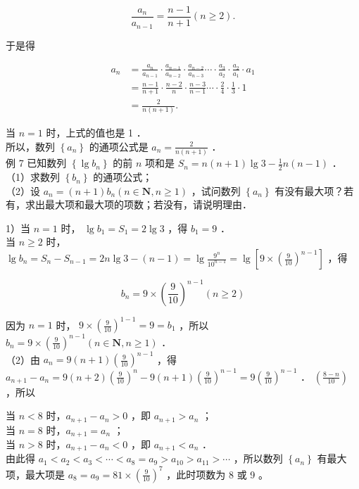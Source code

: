 \documentclass[10pt]{article}
\begin{document}
\[
\frac{a_{n}}{a_{n-1}}=\frac{n-1}{n+1}(n \geqslant 2) .
\]

于是得

\[
\begin{aligned}
a_{n} & =\frac{a_{n}}{a_{n-1}} \cdot \frac{a_{n-1}}{a_{n-2}} \cdot \frac{a_{n-2}}{a_{n-3}} \cdots \cdot \frac{a_{3}}{a_{2}} \cdot \frac{a_{2}}{a_{1}} \cdot a_{1} \\
& =\frac{n-1}{n+1} \cdot \frac{n-2}{n} \cdot \frac{n-3}{n-1} \cdots \cdot \frac{2}{4} \cdot \frac{1}{3} \cdot 1 \\
& =\frac{2}{n(n+1)} .
\end{aligned}
\]

当 \(n=1\) 时，上式的值也是 1 ．\\
所以，数列 \(\left\{a_{n}\right\}\) 的通项公式是 \(a_{n}=\frac{2}{n(n+1)}\) ．\\
例 7 已知数列 \(\left\{\lg b_{n}\right\}\) 的前 \(n\) 项和是 \(S_{n}=n(n+1) \lg 3-\frac{1}{2} n(n-1)\) ．\\
（1）求数列 \(\left\{b_{n}\right\}\) 的通项公式；\\
（2）设 \(a_{n}=(n+1) b_{n}(n \in \mathbf{N}, n \geqslant 1)\) ，试问数列 \(\left\{a_{n}\right\}\) 有没有最大项？若有，求出最大项和最大项的项数；若没有，请说明理由．

1）当 \(n=1\) 时， \(\lg b_{1}=S_{1}=2 \lg 3\) ，得 \(b_{1}=9\) ．\\
当 \(n \geqslant 2\) 时， \(\lg b_{n}=S_{n}-S_{n-1}=2 n \lg 3-(n-1)=\lg \frac{9^{n}}{10^{n-1}}=\lg \left[9 \times\left(\frac{9}{10}\right)^{n-1}\right]\) ，得

\[
b_{n}=9 \times\left(\frac{9}{10}\right)^{n-1}(n \geqslant 2)
\]

因为 \(n=1\) 时， \(9 \times\left(\frac{9}{10}\right)^{1-1}=9=b_{1}\) ，所以 \(b_{n}=9 \times\left(\frac{9}{10}\right)^{n-1}(n \in \mathbf{N}, n \geqslant 1)\) ．\\
（2）由 \(a_{n}=9(n+1)\left(\frac{9}{10}\right)^{n-1}\) ，得 \(a_{n+1}-a_{n}=9(n+2)\left(\frac{9}{10}\right)^{n}-9(n+1)\left(\frac{9}{10}\right)^{n-1}=9\left(\frac{9}{10}\right)^{n-1}\) ． \(\left(\frac{8-n}{10}\right)\) ，所以

当 \(n<8\) 时，\(a_{n+1}-a_{n}>0\) ，即 \(a_{n+1}>a_{n}\) ；\\
当 \(n=8\) 时，\(a_{n+1}=a_{n}\) ；\\
当 \(n>8\) 时，\(a_{n+1}-a_{n}<0\) ，即 \(a_{n+1}<a_{n}\) ．\\
由此得 \(a_{1}<a_{2}<a_{3}<\cdots<a_{8}=a_{9}>a_{10}>a_{11}>\cdots\) ，所以数列 \(\left\{a_{n}\right\}\) 有最大项，最大项是 \(a_{8}=a_{9}=81 \times\left(\frac{9}{10}\right)^{7}\) ，此时项数为 8 或 9 。
\end{document}
